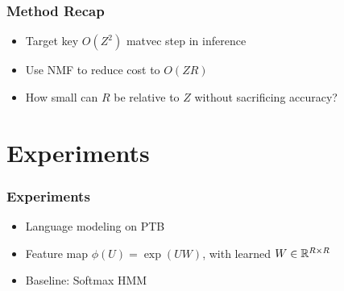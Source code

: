 \documentclass{beamer}
\begin{document}
\begin{frame}
\frametitle{Method Recap}
\begin{itemize}
\item Target key $O(Z^2)$ matvec step in inference
\vspace{2em}
\item Use NMF to reduce cost to $O(ZR)$
\vspace{2em}
\item How small can $R$ be relative to $Z$ without sacrificing accuracy?
\end{itemize}
\end{frame}


\section{Experiments}

\begin{frame}
\frametitle{Experiments}
\begin{itemize}
\item Language modeling on PTB
\vspace{2em}
\item Feature map $\phi(U) = \exp\left(U W\right)$,
with learned $W\in\mathbb{R}^{R \times R}$
\vspace{2em}
\item Baseline: Softmax HMM
\end{itemize}
\end{frame}
\end{document}
